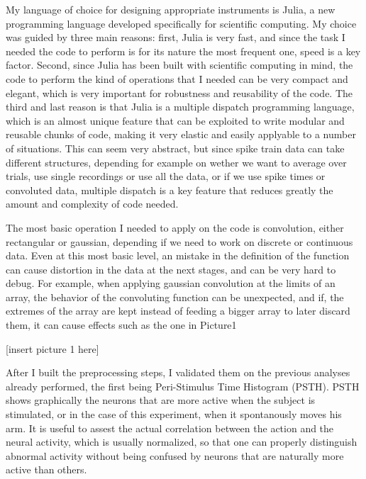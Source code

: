 My language of choice for designing appropriate instruments is Julia, a new programming language developed specifically for scientific computing. My choice was guided by three main reasons: first, Julia is very fast, and since the task I needed the code to perform is for its nature the most frequent one, speed is a key factor. Second, since Julia has been built with scientific computing in mind, the code to perform the kind of operations that I needed can be very compact and elegant, which is very important for robustness and reusability of the code. The third and last reason is that Julia is a multiple dispatch programming language, which is an almost unique feature that can be exploited to write modular and reusable chunks of code, making it very elastic and easily applyable to a number of situations. This can seem very abstract, but since spike train data can take different structures, depending for example on wether we want to average over trials, use single recordings or use all the data, or if we use spike times or convoluted data, multiple dispatch is a key feature that reduces greatly the amount and complexity of code needed.

The most basic operation I needed to apply on the code is convolution, either rectangular or gaussian, depending if we need to work on discrete or continuous data. Even at this most basic level, an mistake in the definition of the function can cause distortion in the data at the next stages, and can be very hard to debug. For example, when applying gaussian convolution at the limits of an array, the behavior of the convoluting function can be unexpected, and if, the extremes of the array are kept instead of feeding a bigger array to later discard them, it can cause effects such as the one in Picture1

[insert picture 1 here]

After I built the preprocessing steps, I validated them on the previous analyses already performed, the first being Peri-Stimulus Time Histogram (PSTH). PSTH shows graphically the neurons that are more active when the subject is stimulated, or in the case of this experiment, when it spontanously moves his arm. It is useful to assest the actual correlation between the action and the neural activity, which is usually normalized, so that one can properly distinguish abnormal activity without being confused by neurons that are naturally more active than others.

